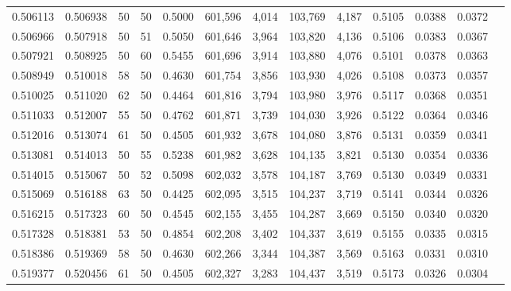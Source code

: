 \begin{tabular}{rrrrrrrrrrrrr}
0.506113 & 0.506938 &    50 &  50 &                                     0.5000 & 601,596 &   4,014 & 103,769 &   4,187 & 0.5105 & 0.0388 & 0.0372 \\
0.506966 & 0.507918 &    50 &  51 &                                     0.5050 & 601,646 &   3,964 & 103,820 &   4,136 & 0.5106 & 0.0383 & 0.0367 \\
0.507921 & 0.508925 &    50 &  60 &                                     0.5455 & 601,696 &   3,914 & 103,880 &   4,076 & 0.5101 & 0.0378 & 0.0363 \\
0.508949 & 0.510018 &    58 &  50 &                                     0.4630 & 601,754 &   3,856 & 103,930 &   4,026 & 0.5108 & 0.0373 & 0.0357 \\
0.510025 & 0.511020 &    62 &  50 &                                     0.4464 & 601,816 &   3,794 & 103,980 &   3,976 & 0.5117 & 0.0368 & 0.0351 \\
0.511033 & 0.512007 &    55 &  50 &                                     0.4762 & 601,871 &   3,739 & 104,030 &   3,926 & 0.5122 & 0.0364 & 0.0346 \\
0.512016 & 0.513074 &    61 &  50 &                                     0.4505 & 601,932 &   3,678 & 104,080 &   3,876 & 0.5131 & 0.0359 & 0.0341 \\
0.513081 & 0.514013 &    50 &  55 &                                     0.5238 & 601,982 &   3,628 & 104,135 &   3,821 & 0.5130 & 0.0354 & 0.0336 \\
0.514015 & 0.515067 &    50 &  52 &                                     0.5098 & 602,032 &   3,578 & 104,187 &   3,769 & 0.5130 & 0.0349 & 0.0331 \\
0.515069 & 0.516188 &    63 &  50 &                                     0.4425 & 602,095 &   3,515 & 104,237 &   3,719 & 0.5141 & 0.0344 & 0.0326 \\
0.516215 & 0.517323 &    60 &  50 &                                     0.4545 & 602,155 &   3,455 & 104,287 &   3,669 & 0.5150 & 0.0340 & 0.0320 \\
0.517328 & 0.518381 &    53 &  50 &                                     0.4854 & 602,208 &   3,402 & 104,337 &   3,619 & 0.5155 & 0.0335 & 0.0315 \\
0.518386 & 0.519369 &    58 &  50 &                                     0.4630 & 602,266 &   3,344 & 104,387 &   3,569 & 0.5163 & 0.0331 & 0.0310 \\
0.519377 & 0.520456 &    61 &  50 &                                     0.4505 & 602,327 &   3,283 & 104,437 &   3,519 & 0.5173 & 0.0326 & 0.0304 \\

\end{tabular}
